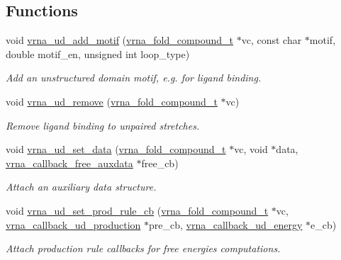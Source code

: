 \subsection*{Functions}
\begin{DoxyCompactItemize}
\item 
void \hyperlink{group__domains__up_gaec0c3313fb2951946614f920d289829a}{vrna\+\_\+ud\+\_\+add\+\_\+motif} (\hyperlink{group__fold__compound_ga1b0cef17fd40466cef5968eaeeff6166}{vrna\+\_\+fold\+\_\+compound\+\_\+t} $\ast$vc, const char $\ast$motif, double motif\+\_\+en, unsigned int loop\+\_\+type)
\begin{DoxyCompactList}\small\item\em Add an unstructured domain motif, e.\+g. for ligand binding. \end{DoxyCompactList}\item 
void \hyperlink{group__domains__up_gada59cb0c498b812eadd010811af3f2d4}{vrna\+\_\+ud\+\_\+remove} (\hyperlink{group__fold__compound_ga1b0cef17fd40466cef5968eaeeff6166}{vrna\+\_\+fold\+\_\+compound\+\_\+t} $\ast$vc)
\begin{DoxyCompactList}\small\item\em Remove ligand binding to unpaired stretches. \end{DoxyCompactList}\item 
void \hyperlink{group__domains__up_gac1f18c312b91d80089534a87d956e58b}{vrna\+\_\+ud\+\_\+set\+\_\+data} (\hyperlink{group__fold__compound_ga1b0cef17fd40466cef5968eaeeff6166}{vrna\+\_\+fold\+\_\+compound\+\_\+t} $\ast$vc, void $\ast$data, \hyperlink{group__fold__compound_ga3ae51bfd5fc3236652d1de4e3274b49b}{vrna\+\_\+callback\+\_\+free\+\_\+auxdata} $\ast$free\+\_\+cb)
\begin{DoxyCompactList}\small\item\em Attach an auxiliary data structure. \end{DoxyCompactList}\item 
void \hyperlink{group__domains__up_ga745a99f0bc72898d54de16f6e538828a}{vrna\+\_\+ud\+\_\+set\+\_\+prod\+\_\+rule\+\_\+cb} (\hyperlink{group__fold__compound_ga1b0cef17fd40466cef5968eaeeff6166}{vrna\+\_\+fold\+\_\+compound\+\_\+t} $\ast$vc, \hyperlink{group__domains__up_ga5cb14c4f2149c3df9842a709d6d64140}{vrna\+\_\+callback\+\_\+ud\+\_\+production} $\ast$pre\+\_\+cb, \hyperlink{group__domains__up_ga60a2244cf1415fd076cc0dba92c2a96d}{vrna\+\_\+callback\+\_\+ud\+\_\+energy} $\ast$e\+\_\+cb)
\begin{DoxyCompactList}\small\item\em Attach production rule callbacks for free energies computations. \end{DoxyCompactList}\item 

\end{DoxyCompactItemize}
